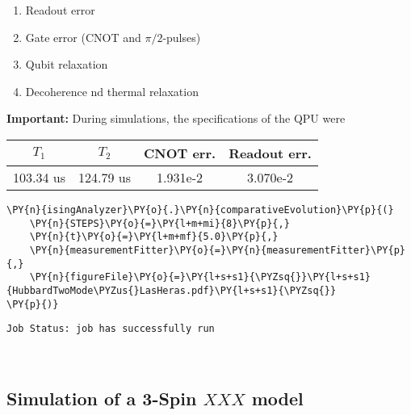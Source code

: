 \begin{enumerate}
\def\labelenumi{\arabic{enumi}.}
\tightlist
\item
  Readout error
\item
  Gate error (CNOT and \(\pi/2\)-pulses)
\item
  Qubit relaxation
\item
  Decoherence nd thermal relaxation
\end{enumerate}

\textbf{Important:} During simulations, the specifications of the QPU
were

\begin{longtable}[]{@{}cccc@{}}
\toprule
\(T_1\) & \(T_2\) & CNOT err. & Readout err. \\
\midrule
\endhead
103.34 us & 124.79 us & 1.931e-2 & 3.070e-2 \\
\bottomrule
\end{longtable}

    \begin{tcolorbox}[breakable, size=fbox, boxrule=1pt, pad at break*=1mm,colback=cellbackground, colframe=cellborder]
\begin{Verbatim}[commandchars=\\\{\}]
\PY{n}{isingAnalyzer}\PY{o}{.}\PY{n}{comparativeEvolution}\PY{p}{(}
    \PY{n}{STEPS}\PY{o}{=}\PY{l+m+mi}{8}\PY{p}{,} 
    \PY{n}{t}\PY{o}{=}\PY{l+m+mf}{5.0}\PY{p}{,}
    \PY{n}{measurementFitter}\PY{o}{=}\PY{n}{measurementFitter}\PY{p}{,}
    \PY{n}{figureFile}\PY{o}{=}\PY{l+s+s1}{\PYZsq{}}\PY{l+s+s1}{HubbardTwoMode\PYZus{}LasHeras.pdf}\PY{l+s+s1}{\PYZsq{}}
\PY{p}{)}
\end{Verbatim}
\end{tcolorbox}

    \begin{Verbatim}[commandchars=\\\{\}]
Job Status: job has successfully run
    \end{Verbatim}

    \begin{center}
    \end{center}
    { \hspace*{\fill} \\}
    
    \hypertarget{simulation-of-a-3-spin-xxx-model}{%
\subsection{\texorpdfstring{Simulation of a 3-Spin \(XXX\)
model}{Simulation of a 3-Spin XXX model}}\label{simulation-of-a-3-spin-xxx-model}}

